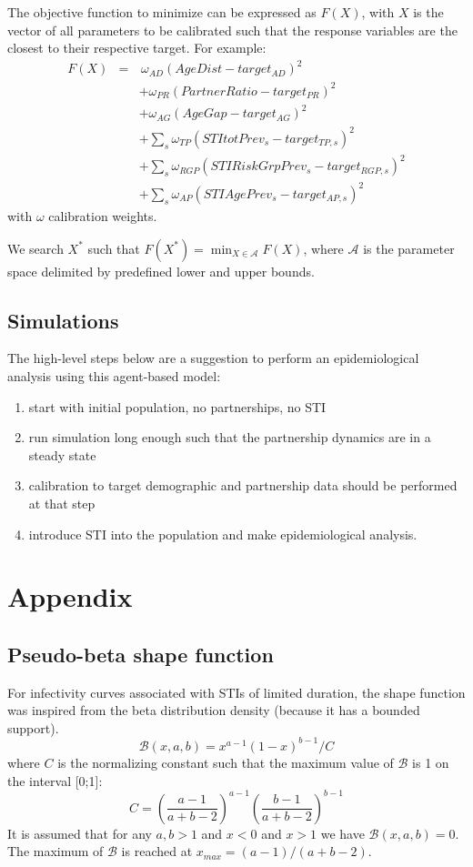 \documentclass[11pt, onecolumn]{article}
\begin{document}
The objective function to minimize can be expressed as $F(X)$, with $X$ is the vector of all parameters to be calibrated such that the response variables are the closest to their respective target. For example:
\begin{eqnarray*}
F(X) & =&\,\omega_{AD}(AgeDist - target_{AD})^2 \\
& & + \omega_{PR}(PartnerRatio - target_{PR})^2 \\
& & + \omega_{AG}(AgeGap - target_{AG})^2 \\
& & +\sum_s \omega_{TP}(STItotPrev_s-target_{TP,s})^2 \\
& & +\sum_s \omega_{RGP}(STIRiskGrpPrev_s-target_{RGP,s})^2\\
& & +\sum_s \omega_{AP}(STIAgePrev_s-target_{AP,s})^2
\end{eqnarray*}
with $\omega$ calibration weights. 

We search $X^*$ such that $F(X^*)=\min_{X\in \mathcal{A}} F(X)$, where $\mathcal{A}$ is the parameter space delimited by predefined lower and upper bounds.


\subsection{Simulations}

The high-level steps below are a suggestion to perform an epidemiological analysis using this agent-based model:

\begin{enumerate}
\item start with initial population, no partnerships, no STI
\item run simulation long enough such that the partnership dynamics are in a steady state
\item calibration to target demographic and partnership data should be performed at that step
\item introduce STI into the population and make epidemiological analysis.
\end{enumerate}


\section{Appendix}
\subsection{Pseudo-beta shape function} \label{sec:pseudobeta}

For infectivity curves associated with STIs of limited duration, the shape function was inspired from the beta distribution density (because it has a bounded support).
$$\mathcal{B}(x,a,b) = x^{a-1}(1-x)^{b-1}/C$$
where $C$ is the normalizing constant such that the maximum value of $\mathcal{B}$ is 1 on the interval [0;1]:
$$C=\left(\frac{a-1}{a+b-2}\right)^{a-1}\left(\frac{b-1}{a+b-2}\right)^{b-1}$$
It is assumed that for any $a,b>1$ and  $x<0$ and $x>1$ we have $\mathcal{B}(x,a,b)=0$.
The maximum of $\mathcal{B}$ is reached at $x_{max}=(a-1)/(a+b-2)$.


\newpage


\end{document}

